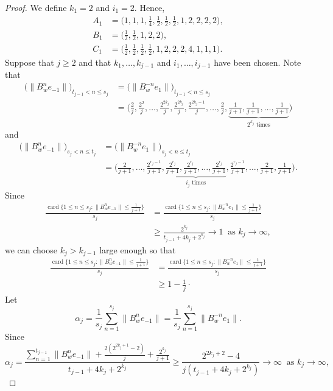 \documentclass[12pt]{amsart}
\theoremstyle{theorem}
\theoremstyle{definition}
\theoremstyle{remark} \theoremstyle{question} \theoremstyle{example}
\newcommand{\card}{\operatorname{card}}
\begin{document}
\begin{proof}
We define $k_1 = 2$ and $i_1 = 2$. Hence,
\begin{align*}
A_1 &= \Big(1,1,1,\frac{1}{4},\frac{1}{2},\frac{1}{2},\frac{1}{2},1,2,2,2,2\Big), \\
B_1 &= \Big(\frac{1}{2},\frac{1}{2},1,2,2\Big), \\
C_1 &= \Big(\frac{1}{2},\frac{1}{2},\frac{1}{2},\frac{1}{2},1,2,2,2,4,1,1,1\Big).
\end{align*}
Suppose that $j \geq 2$ and that $k_1,\ldots,k_{j-1}$ and $i_1,\ldots,i_{j-1}$ have been chosen. Note that
\begin{align*}
\big(\|B_w^n e_{-1}\|\big)_{t_{j-1} < n \leq s_j} &= \big(\|B_w^{-n} e_1\|\big)_{t_{j-1} < n \leq s_j}\\
&= \Big(\frac{2}{j},\frac{2^2}{j},\ldots,\frac{2^{2k_j}}{j},\frac{2^{2k_j}}{j},
  \frac{2^{2k_j-1}}{j},\ldots,\frac{2}{j},\underbrace{\frac{1}{j+1},\frac{1}{j+1},\ldots,\frac{1}{j+1}}_{2^{k_j} \text{ times}}\Big)
\end{align*}
and
\begin{align*}
\big(\|B_w^n e_{-1}\|\big)_{s_j < n \leq t_j} &= \big(\|B_w^{-n} e_1\|\big)_{s_j < n \leq t_j}\\
&= \Big(\frac{2}{j+1},\ldots,\frac{2^{r_j-1}}{j+1},
  \underbrace{\frac{2^{r_j}}{j+1},\frac{2^{r_j}}{j+1},\ldots,\frac{2^{r_j}}{j+1}}_{i_j \text{ times}},
  \frac{2^{r_j-1}}{j+1},\ldots,\frac{2}{j+1},\frac{1}{j+1}\Big).
\end{align*}
Since
\begin{align*}
\frac{\card\{1 \leq n \leq s_j : \|B_w^n e_{-1}\| \leq \frac{1}{j+1}\}}{s_j} 
&= \frac{\card\{1 \leq n \leq s_j : \|B_w^{-n} e_1\| \leq \frac{1}{j+1}\}}{s_j}\\
&\geq \frac{2^{k_j}}{t_{j-1} + 4k_j + 2^{k_j}} \to 1 \ \text{ as } k_j \to \infty,
\end{align*}
we can choose $k_j > k_{j-1}$ large enough so that
\begin{align}\label{AE-T3-Eq1}
\frac{\card\{1 \leq n \leq s_j : \|B_w^n e_{-1}\| \leq \frac{1}{j+1}\}}{s_j} 
&= \frac{\card\{1 \leq n \leq s_j : \|B_w^{-n} e_1\| \leq \frac{1}{j+1}\}}{s_j}\\
&\geq 1 - \frac{1}{j}\cdot \nonumber
\end{align}
Let
\[
\alpha_j = \frac{1}{s_j} \sum_{n=1}^{s_j} \|B_w^n e_{-1}\| = \frac{1}{s_j} \sum_{n=1}^{s_j} \|B_w^{-n} e_1\|.
\]
Since
\[
\alpha_j = \frac{\sum_{n=1}^{t_{j-1}} \|B_w^n e_{-1}\| + \frac{2(2^{2k_j + 1}-2)}{j} + \frac{2^{k_j}}{j+1}}{t_{j-1} + 4k_j + 2^{k_j}}
  \geq \frac{2^{2k_j+2} - 4}{j(t_{j-1} + 4k_j + 2^{k_j})} \to \infty \ \text{ as } k_j \to \infty,
\]
\end{proof}
\end{document}
